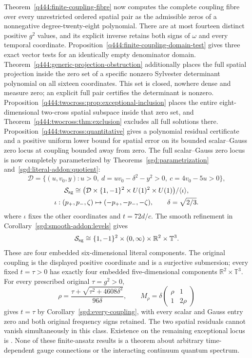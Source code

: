 Theorem~\ref{q444:finite-coupling-fibre} now computes the complete
coupling fibre over every unrestricted ordered spatial pair as the
admissible zeros of a nonnegative degree-twenty-eight polynomial.
There are at most fourteen distinct positive $g^2$ values, and its
explicit inverse retains both signs of $\omega$ and every temporal
coordinate. Proposition~\ref{q444:finite-coupling-domain-test} gives
three exact vector tests for an identically empty denominator domain.
Theorem~\ref{q444:generic-projection-obstruction} additionally places
the full spatial projection inside the zero set of a specific nonzero
Sylvester determinant polynomial on all sixteen coordinates. This
set is closed, nowhere dense and measure zero; an explicit full pair
certifies the determinant is nonzero. Proposition~\ref{q444:twocross:prop:exceptional-inclusion} places the
entire eight-dimensional two-cross spatial subspace inside that zero set,
and Theorem~\ref{q444:twocross:thm:exclusion} excludes all full solutions
there. Proposition~\ref{q444:twocross:quantitative} gives a polynomial
residual certificate and a positive uniform lower bound for spatial error
on its bounded scalar--Gauss zero locus at coupling bounded away from zero.
The full scalar--Gauss zero locus is now completely parameterized by
Theorems~\ref{sgd:parametrization} and~\ref{sgd:literal-addon:quotient}:
\[
 \mathcal D=\{(u,v_0,y):u>0,\ d=uv_0-\delta^2-y^2>0,
                       \ c=4v_0-5u>0\},
\]
\[
 \begin{gathered}
 \mathcal S_{\rm sg}\cong
 \bigl(\mathcal D\times\{1,-1\}^2\times U(1)^2\times U(1)\bigr)
 /\langle\iota\rangle,\\
 \iota:(p_+,p_-,\zeta)\mapsto(-p_+,-p_-,-\zeta),
 \qquad \delta=\sqrt{2/3}.
 \end{gathered}
\]
where $\iota$ fixes the other coordinates and $t=72d/c$.
The smooth refinement in Corollary~\ref{sgd:smooth-addon:levels} gives
\[
 \mathcal S_{\rm sg}\cong\{1,-1\}^2\times(0,\infty)
                  \times\mathbb R^2\times\mathbb T^3.
\]
These are four embedded six-dimensional literal components. The original
coupling is the displayed positive coordinate and is a surjective
submersion; every fixed $t=\tau>0$ has exactly four embedded
five-dimensional components $\mathbb R^2\times\mathbb T^3$.
For every prescribed original $\tau=g^2>0$,
\[
 \rho=\frac{\tau+\sqrt{\tau^2+4608\delta^2}}{96\delta},\qquad
 M_\rho=\delta\begin{pmatrix}\rho&1\\1&2\rho\end{pmatrix}
\]
gives $t=\tau$ by Corollary~\ref{sgd:every-coupling}, with every
scalar and Gauss entry zero and both original frequency signs retained.
The two spatial residuals cannot vanish simultaneously in this class.
Existence on the remaining exceptional locus is \Open. None of these finite-ansatz results
is a theorem about arbitrary time-dependent gauge connections or
the interacting continuum quantum spectrum.

